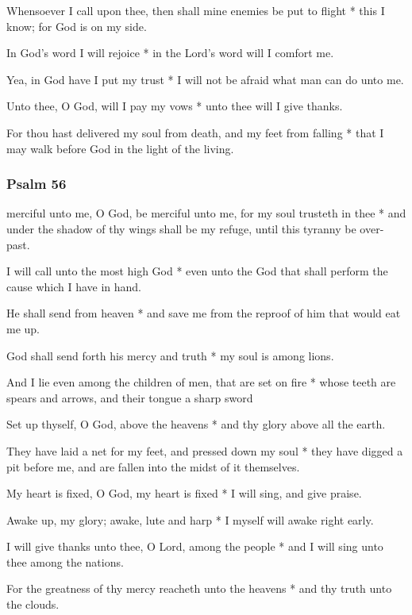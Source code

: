 Whensoever I call upon thee, then shall mine enemies be put to flight * this I know; for God is on my side.

In God's word I will rejoice * in the Lord's word will I comfort me.

Yea, in God have I put my trust * I will not be afraid what man can do unto me.

Unto thee, O God, will I pay my vows * unto thee will I give thanks.

For thou hast delivered my soul from death, and my feet from falling * that I may walk before God in the light of the living.

\subsubsection{Psalm 56}


 merciful unto me, O God, be merciful unto me, for my soul trusteth in thee * and under the shadow of thy wings shall be my refuge, until this tyranny be over-past.

I will call unto the most high God * even unto the God that shall perform the cause which I have in hand.

He shall send from heaven * and save me from the reproof of him that would eat me up.

God shall send forth his mercy and truth * my soul is among lions.

And I lie even among the children of men, that are set on fire * whose teeth are spears and arrows, and their tongue a sharp sword

Set up thyself, O God, above the heavens * and thy glory above all the earth.

They have laid a net for my feet, and pressed down my soul * they have digged a pit before me, and are fallen into the midst of it themselves.

My heart is fixed, O God, my heart is fixed * I will sing, and give praise.

Awake up, my glory; awake, lute and harp * I myself will awake right early.

I will give thanks unto thee, O Lord, among the people * and I will sing unto thee among the nations.

For the greatness of thy mercy reacheth unto the heavens * and thy truth unto the clouds.

